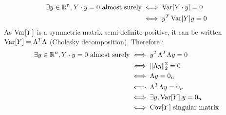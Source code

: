 \begin{solution}
\begin{enumerate}
\begin{align*}
            \exists y\in \mathbb{R}^n, Y \cdot y = 0  \text{ almost surely} & \iff \operatorname{Var}[Y \cdot y] = 0 \\
                                                                    & \iff y^T \operatorname{Var}[Y] y = 0   \\
          \end{align*}
          As $\operatorname{Var}[Y]$ is a symmetric matrix semi-definite positive, it can be written $\operatorname{Var}[Y] = \Lambda^T \Lambda$ (Cholesky decomposition). Therefore :
          \begin{align*}
            \exists y\in \mathbb{R}^n, Y \cdot y = 0  \text{ almost surely} & \iff y^T \Lambda^T \Lambda y = 0     \\
                                                                    & \iff \|\Lambda y\|_2^2 = 0           \\
                                                                    & \iff \Lambda y = 0_n                 \\
                                                                    & \iff \Lambda^T \Lambda y = 0_n       \\
                                                                    & \iff \exists y, \operatorname{Var}[Y] . y = 0_n    \\
                                                                    & \iff \operatorname{Cov}[Y] \text{ singular matrix}
          \end{align*}
  \end{enumerate}
\end{solution}